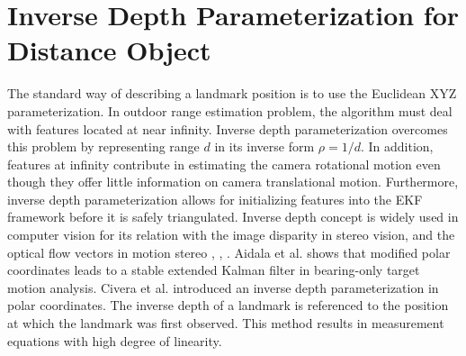 \section{Inverse Depth Parameterization for Distance Object}
The standard way of describing a landmark position is to use the
Euclidean XYZ parameterization. In outdoor range estimation
problem, the algorithm must deal with features located at near
infinity. Inverse depth parameterization overcomes this problem by
representing range $d$ in its inverse form $\rho =1/d$. In addition,
features at infinity contribute in estimating the camera rotational
motion even though they offer little information on camera
translational motion. Furthermore, inverse depth parameterization
allows for initializing features into the EKF framework before it is
safely triangulated. Inverse depth concept is widely used in computer
vision for its relation with the image disparity in stereo vision, and
the optical flow vectors in motion stereo
\cite{okutomi_multiple-baseline_1991}, \cite{jepson_fast_1991},
\cite{chowdhury_stochastic_2003}. Aidala et al.
\cite{aidala_utilization_1983} shows that modified polar coordinates
leads to a stable extended Kalman filter in bearing-only target motion
analysis. Civera et al. \cite{civera_inverse_2008} introduced an
inverse depth parameterization in polar coordinates. The inverse depth
of a landmark is referenced to the position at which the landmark was
first observed. This method results in measurement equations with high
degree of linearity.





